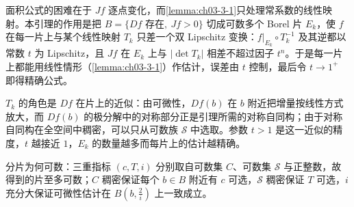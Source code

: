 \documentclass[../../main.tex]{subfiles}%
\begin{document}
\begin{remark}\label{remark:ch03-lem-3-3-动机}
面积公式的困难在于 $Jf$ 逐点变化，而\cref{lemma:ch03-3-1}只处理常系数的线性映射。本引理的作用是把 $B=\{Df\text{ 存在},\ Jf>0\}$ 切成可数多个 Borel 片 $E_k$，使 $f$ 在每一片上与某个线性映射 $T_k$ 只差一个双 Lipschitz 变换：$f|_{E_k}\circ T_k^{-1}$ 及其逆都以常数 $t$ 为 Lipschitz，且 $Jf$ 在 $E_k$ 上与 $\lvert\det T_k\rvert$ 相差不超过因子 $t^n$。于是每一片上都能用线性情形（\cref{lemma:ch03-3-1}）作估计，误差由 $t$ 控制，最后令 $t\to1^+$ 即得精确公式。%

$T_k$ 的角色是 $Df$ 在片上的近似：由可微性，$Df(b)$ 在 $b$ 附近把增量按线性方式放大，而 $Df(b)$ 的极分解中的对称部分正是引理所需的对称自同构；由于对称自同构在全空间中稠密，可以只从可数族 $\mathcal{S}$ 中选取。参数 $t>1$ 是这一近似的精度，$t$ 越接近 $1$，$E_k$ 的数量越多而每片上的估计越精确。

分片为何可数：三重指标 $(c,T,i)$ 分别取自可数集 $C$、可数集 $\mathcal{S}$ 与正整数，故得到的片至多可数；$C$ 稠密保证每个 $b\in B$ 附近有 $c$ 可选，$\mathcal{S}$ 稠密保证 $T$ 可选，$i$ 充分大保证可微性估计在 $B(b,\frac2i)$ 上一致成立。
\end{remark}
\end{document}
